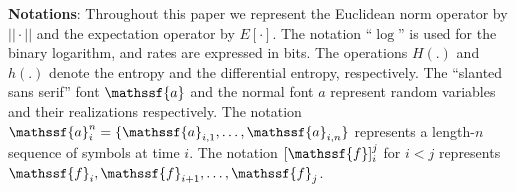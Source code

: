 \documentclass[journal, twocolumn, 10pt]{IEEEtran}
\newcommand{\rva}{{\mathssf{a}}}    %
\newcommand{\rvf}{{\mathssf{f}}}    %
\newcommand{\bof}[1]{\textbf{#1}}
\begin{document}
{\bf Notations}: Throughout this paper we represent the  Euclidean norm operator by $||\cdot||$ and the expectation operator by $E[\cdot]$. 
The notation ``$\log$'' is used for the binary logarithm, and rates are expressed in bits.
 The operations $H(.)$ and $h(.)$ denote the entropy and the differential entropy, respectively.  
The ``slanted sans serif'' font $\rva$ and the normal font $a$ represent random variables and their realizations respectively. 
The notation $\rva_{i}^{n}=\{\rva_{i,1},\ldots,\rva_{i,n}\}$ represents a length-$n$ sequence of symbols at time $i$. 
The notation $[\rvf]_{i}^{j}$ for $i< j$ represents $\rvf_{i},\rvf_{i+1}, \ldots, \rvf_{j}$. 





%
%
%
%
%
%
%
%
% 
\end{document}
